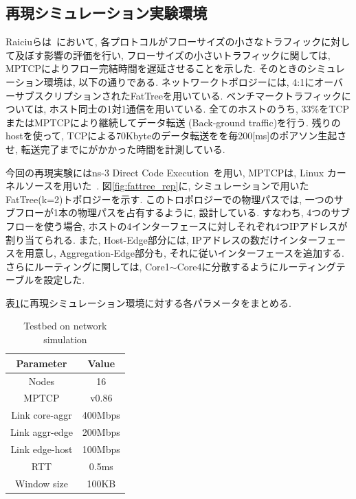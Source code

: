 \documentclass[10pt, a4paper, twocolumn]{jsarticle}
\begin{document}
\subsection{再現シミュレーション実験環境}
Raiciuらは~\cite{improving}において, 各プロトコルがフローサイズの小さなトラフィックに対して及ぼす影響の評価を行い,
フローサイズの小さいトラフィックに関しては, MPTCPによりフロー完結時間を遅延させることを示した.
そのときのシミュレーション環境は, 以下の通りである.
ネットワークトポロジーには, 4:1にオーバーサブスクリプションされたFatTreeを用いている.
ベンチマークトラフィックについては, ホスト同士の1対1通信を用いている.
全てのホストのうち, 33\%をTCPまたはMPTCPにより継続してデータ転送 (Back-ground traffic)を行う.
残りのhostを使って, TCPによる70Kbyteのデータ転送をを毎200[ms]のポアソン生起させ, 転送完了までにがかかった時間を計測している.

今回の再現実験にはns-3 Direct Code Execution~\cite{ns3}を用い, MPTCPは, Linux
カーネルソースを用いた~\cite{mptcp_linux}.
図\ref{fig:fattree_rep}に, シミュレーションで用いたFatTree(k=2)トポロジーを示す.
このトロポロジーでの物理パスでは, 一つのサブフローが1本の物理パスを占有するように, 設計している.
すなわち, 4つのサブフローを使う場合, ホストの4インターフェースに対しそれぞれ4つIPアドレスが割り当てられる.
また, Host-Edge部分には, IPアドレスの数だけインターフェースを用意し, Aggregation-Edge部分も,
それに従いインターフェースを追加する.
さらにルーティングに関しては, Core1$\sim$Core4に分散するようにルーティングテーブルを設定した.

表\ref{table:testbed}に再現シミュレーション環境に対する各パラメータをまとめる.
\begin{table}[h]
\begin{center}
\footnotesize
\begin{tabular}{c|c}
\hline
Parameter & Value \\ \hline \hline
Nodes & 16 \\
MPTCP & v0.86 \\
Link core-aggr & 400Mbps \\
Link aggr-edge & 200Mbps \\
Link edge-host & 100Mbps \\
RTT & 0.5ms\\
Window size & 100KB \\
\hline
\end{tabular}
\caption{Testbed on network simulation}
\label{table:testbed}
\end{center}
\end{table}
\end{document}

